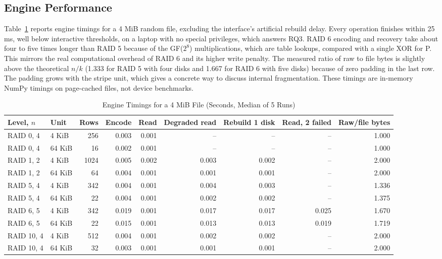 \documentclass{ieeeaccess}
\begin{document}
\subsection{Engine Performance}
Table~\ref{tab:perf} reports engine timings for a 4 MiB random file, excluding the interface's artificial rebuild delay. Every operation finishes within 25 ms, well below interactive thresholds, on a laptop with no special privileges, which answers RQ3. RAID 6 encoding and recovery take about four to five times longer than RAID 5 because of the GF($2^8$) multiplications, which are table lookups, compared with a single XOR for P. This mirrors the real computational overhead of RAID 6 and its higher write penalty. The measured ratio of raw to file bytes is slightly above the theoretical $n/k$ (1.333 for RAID 5 with four disks and 1.667 for RAID 6 with five disks) because of zero padding in the last row. The padding grows with the stripe unit, which gives a concrete way to discuss internal fragmentation. These timings are in-memory NumPy timings on page-cached files, not device benchmarks.

\begin{table}[!t]
\caption{Engine Timings for a 4 MiB File (Seconds, Median of 5 Runs)}
\label{tab:perf}
\centering
\footnotesize
\begin{tabular}{llrrrrrrr}
\toprule
Level, $n$ & Unit & Rows & Encode & Read & Degraded read & Rebuild 1 disk & Read, 2 failed & Raw/file bytes \\
\midrule
RAID 0, 4 & 4 KiB & 256 & 0.003 & 0.001 & -- & -- & -- & 1.000 \\
RAID 0, 4 & 64 KiB & 16 & 0.002 & 0.001 & -- & -- & -- & 1.000 \\
RAID 1, 2 & 4 KiB & 1024 & 0.005 & 0.002 & 0.003 & 0.002 & -- & 2.000 \\
RAID 1, 2 & 64 KiB & 64 & 0.004 & 0.001 & 0.001 & 0.001 & -- & 2.000 \\
RAID 5, 4 & 4 KiB & 342 & 0.004 & 0.001 & 0.004 & 0.003 & -- & 1.336 \\
RAID 5, 4 & 64 KiB & 22 & 0.004 & 0.001 & 0.002 & 0.002 & -- & 1.375 \\
RAID 6, 5 & 4 KiB & 342 & 0.019 & 0.001 & 0.017 & 0.017 & 0.025 & 1.670 \\
RAID 6, 5 & 64 KiB & 22 & 0.015 & 0.001 & 0.013 & 0.013 & 0.019 & 1.719 \\
RAID 10, 4 & 4 KiB & 512 & 0.004 & 0.001 & 0.002 & 0.002 & -- & 2.000 \\
RAID 10, 4 & 64 KiB & 32 & 0.003 & 0.001 & 0.001 & 0.001 & -- & 2.000 \\
\bottomrule
\end{tabular}
\end{table}
\end{document}

